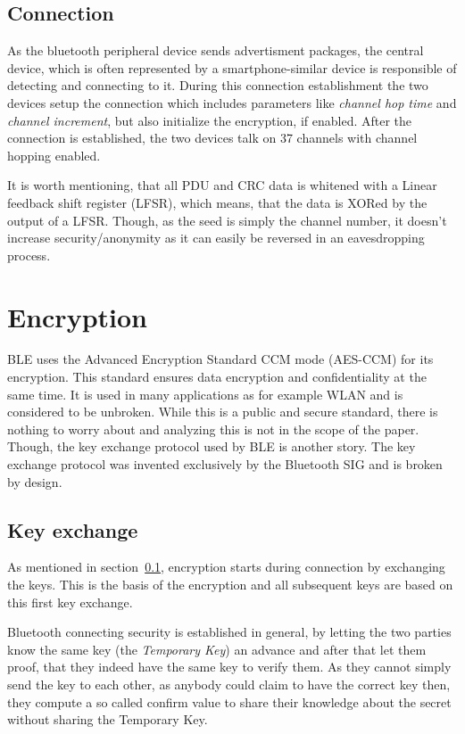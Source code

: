 \documentclass[conference]{IEEEtran}
\begin{document}
\subsection{Connection} \label{ssec:con}

As the bluetooth peripheral device sends advertisment packages, the central device, which is often represented by a smartphone-similar device is responsible of detecting and connecting to it. During this connection establishment the two devices setup the connection which includes parameters like \emph{channel hop time} and \emph{channel increment}, but also initialize the encryption, if enabled. After the connection is established, the two devices talk on 37 channels with channel hopping enabled.

It is worth mentioning, that all PDU and CRC data is whitened with a Linear feedback shift register (LFSR), which means, that the data is XORed by the output of a LFSR. Though, as the seed is simply the channel number, it doesn't increase security/anonymity as it can easily be reversed in an eavesdropping process.

\section{Encryption}

BLE uses the Advanced Encryption Standard CCM mode (AES-CCM) for its encryption. This standard ensures data encryption and confidentiality at the same time. It is used in many applications as for example WLAN and is considered to be unbroken. While this is a public and secure standard, there is nothing to worry about and analyzing this is not in the scope of the paper. Though, the key exchange protocol used by BLE is another story. The key exchange protocol was invented exclusively by the Bluetooth SIG and is broken by design.

\subsection{Key exchange}
\label{sub:key_exchange}

As mentioned in section~\ref{ssec:con}, encryption starts during connection by exchanging the keys. This is the basis of the encryption and all subsequent keys are based on this first key exchange.

Bluetooth connecting security is established in general, by letting the two parties know the same key (the \emph{Temporary Key}) an advance and after that let them proof, that they indeed have the same key to verify them. As they cannot simply send the key to each other, as anybody could claim to have the correct key then, they compute a so called confirm value to share their knowledge about the secret without sharing the Temporary Key.
\end{document}
